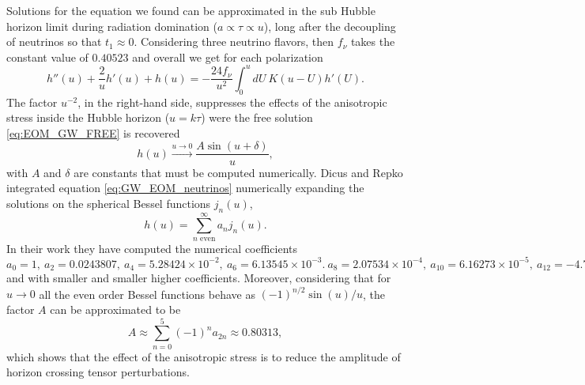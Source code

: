 Solutions for the equation we found can be approximated in the sub Hubble horizon limit during radiation domination ($a\propto\tau\propto u$), long after the decoupling of neutrinos so that $t_1\approx 0$. Considering three neutrino flavors, then $f_\nu$ takes the constant value of $0.40523$ and overall we get for each polarization
$$ h''(u)+\frac{2}{u}h'(u)+h(u)=-\frac{24f_\nu}{u^2}\int_{0}^{u}dU\ K(u-U)h'(U).$$
The factor $u^{-2}$, in the right-hand side, suppresses the effects of the anisotropic stress inside the Hubble horizon ($u=k\tau$) were the free solution \eqref{eq:EOM_GW_FREE} is recovered
$$h(u)\xrightarrow{u\to 0} \frac{A\sin(u+\delta)}{u},$$
with $A$ and $\delta$ are constants that must be computed numerically. Dicus and Repko \cite{Dicus_Repko} integrated equation \eqref{eq:GW_EOM_neutrinos} numerically expanding the solutions on the spherical Bessel functions $j_n(u)$,
\begin{equation}
    \label{eq:Tmodes_nu_damped}
    h(u)=\sum_{n\text{ even}}^{\infty}a_n j_n(u).
\end{equation}
 In their work they have computed the numerical coefficients $a_0=1,\ a_2=0.0243807,\ a_4=5.28424\times10^{-2},\ a_6= 6.13545\times10^{-3}.\ a_8=2.07534\times10^{-4},\ a_{10}=6.16273\times10^{-5},\ a_{12}=-4.78885\times10^{-6}$ and with smaller and smaller higher coefficients. 
 Moreover, considering that for $u\to0$ all the even order Bessel functions behave as $(-1)^{n/2}\sin(u)/u$, the factor $A$ can be approximated to be
$$A\approx \sum_{n=0}^{5}(-1)^n a_{2n}\approx 0.80313,$$
which shows that the effect of the anisotropic stress is to reduce the amplitude of horizon crossing tensor perturbations.

